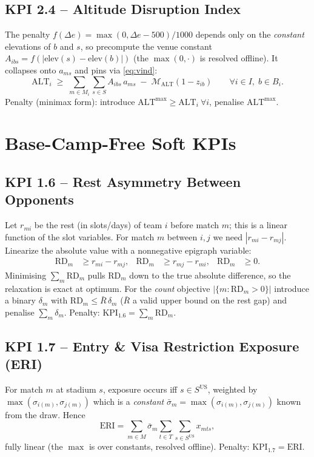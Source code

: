 \documentclass[12pt, letterpaper]{article}
\begin{document}
\subsection{KPI 2.4 -- Altitude Disruption Index}
The penalty $f(\Delta e)=\max(0,\Delta e-500)/1000$ depends only on the
\emph{constant} elevations of $b$ and $s$, so precompute the venue
constant $A_{ibs}=f(|\mathrm{elev}(s)-\mathrm{elev}(b)|)$ (the
$\max(0,\cdot)$ is resolved offline). It collapses onto $a_{ms}$ and pins
via \eqref{eq:vind}:
\begin{equation}
\mathrm{ALT}_i \;\ge\; \sum_{m\in M_i}\sum_{s\in S}A_{ibs}\,a_{ms}
  \;-\;\mathcal{M}_{\mathrm{ALT}}(1-z_{ib})
  \qquad\forall i\in I,\;b\in B_i.
\end{equation}
Penalty (minimax form): introduce $\mathrm{ALT}^{\max}\ge \mathrm{ALT}_i\
\forall i$, penalise $\mathrm{ALT}^{\max}$.

\section{Base-Camp-Free Soft KPIs}
\label{sec:free-kpi}

\subsection{KPI 1.6 -- Rest Asymmetry Between Opponents}
Let $r_{mi}$ be the rest (in slots/days) of team $i$ before match $m$;
this is a linear function of the slot variables. For match $m$ between
$i,j$ we need $|r_{mi}-r_{mj}|$. Linearize the absolute value with a
nonnegative epigraph variable:
\begin{align}
\mathrm{RD}_m &\ge r_{mi}-r_{mj}, &
\mathrm{RD}_m &\ge r_{mj}-r_{mi}, &
\mathrm{RD}_m&\ge 0.
\end{align}
Minimising $\sum_m\mathrm{RD}_m$ pulls $\mathrm{RD}_m$ down to the true
absolute difference, so the relaxation is exact at optimum. For the
\emph{count} objective $|\{m:\mathrm{RD}_m>0\}|$ introduce a binary
$\delta_m$ with $\mathrm{RD}_m\le \bar R\,\delta_m$ ($\bar R$ a valid
upper bound on the rest gap) and penalise $\sum_m\delta_m$. Penalty:
$\mathrm{KPI}_{1.6}=\sum_m \mathrm{RD}_m$.

\subsection{KPI 1.7 -- Entry \& Visa Restriction Exposure (ERI)}
For match $m$ at stadium $s$, exposure occurs iff $s\in S^{\mathrm{US}}$,
weighted by $\max(\sigma_{i(m)},\sigma_{j(m)})$ which is a \emph{constant}
$\bar\sigma_m=\max(\sigma_{i(m)},\sigma_{j(m)})$ known from the draw.
Hence
\begin{equation}
\mathrm{ERI}=\sum_{m\in M}\bar\sigma_m
  \sum_{t\in T}\sum_{s\in S^{\mathrm{US}}} x_{mts},
\end{equation}
fully linear (the $\max$ is over constants, resolved offline). Penalty:
$\mathrm{KPI}_{1.7}=\mathrm{ERI}$.
\end{document}
